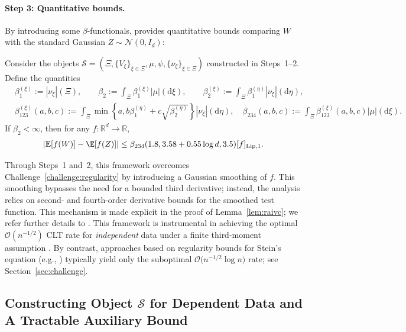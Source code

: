 \documentclass[mnsc,nonblindrev]{informs3}
\begin{document}
\paragraph{Step 3: Quantitative bounds.} By introducing some \(\beta\)-functionals, \cite[Theorem~2.9]{raivc2018multivariate}
provides quantitative bounds comparing \(W\) with the standard Gaussian
\(Z\sim\mathcal N(0,I_d)\):

\begin{lemma}\label{lem:raivc}
Consider the objects \(\mathcal S = (\Xi,\{V_\xi\}_{\xi\in\Xi},\mu,\psi,\{\nu_\xi\}_{\xi\in\Xi})\) constructed in
Steps~1–2.
Define the quantities
\begin{align*}
&\beta_1^{(\xi)}  :=|\nu_{\xi}|(\Xi),  \qquad \beta_2  :=\int_{\Xi} \beta_1^{(\xi)}|\mu|(\mathrm{d} \xi), 
\qquad \beta_2^{(\xi)}  :=\int_{\Xi} \beta_1^{(\eta)}|\nu_{\xi}|(\mathrm{d} \eta), \\
&\beta_{123}^{(\xi)}(a, b, c)  :=\int_{\Xi} \min \left\{a, b \beta_1^{(\eta)}+c \sqrt{\beta_2^{(\eta)}}\right\}|\nu_{\xi}|(\mathrm{d} \eta),\quad  \beta_{234}(a, b, c)  :=\int_{\Xi} \beta_{123}^{(\xi)}(a, b, c)|\mu|(\mathrm{d} \xi).
\end{align*}
If \(\beta_2<\infty\), then for any \(f:\mathbb R^d\to\mathbb R\),
\begin{align*}
 |\mathbb{E}[f(W)]-\E[f(Z)]| \leq \beta_{234}(1.8,3.58+0.55 \log d, 3.5) [f]_{\operatorname{Lip},1} .
\end{align*}
\end{lemma}

Through Steps~1 and~2, this framework overcomes Challenge~\ref{challenge:regularity} by
introducing a Gaussian smoothing of $f$.  This smoothing bypasses the need for a bounded third derivative; instead, the
analysis relies on second- and fourth-order derivative bounds for the smoothed
test function. This mechanism is made explicit in the proof of
Lemma~\ref{lem:raivc}; we refer further details to \cite{raivc2018multivariate}. This framework is instrumental in achieving the optimal $\mathcal{O}(n^{-1/2})$
CLT rate for \emph{independent} data under a finite third-moment assumption
\citep{raivc2018multivariate}. By contrast, approaches based on regularity bounds
for Stein's equation (e.g., \cite{gallouet2018regularity}) typically yield only
the suboptimal $\mathcal{O}\bigl(n^{-1/2}\log n\bigr)$ rate; see
Section~\ref{sec:challenge}.

\subsection{Constructing Object $\mathcal S$ for Dependent Data and A Tractable Auxiliary Bound}\label{sec:ourS} 
\end{document}
